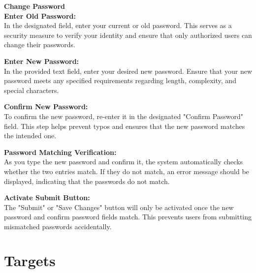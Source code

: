 \documentclass{article}
\begin{document}
\textbf{Change Password}\\
\textbf{Enter Old Password:}\\
In the designated field, enter your current or old password. This serves as a security measure to verify your identity and ensure that only authorized users can change their passwords.

\textbf{Enter New Password:}\\
In the provided text field, enter your desired new password. Ensure that your new password meets any specified requirements regarding length, complexity, and special characters.

\textbf{Confirm New Password:}\\
To confirm the new password, re-enter it in the designated "Confirm Password" field. This step helps prevent typos and ensures that the new password matches the intended one.

\textbf{Password Matching Verification:}\\
As you type the new password and confirm it, the system automatically checks whether the two entries match. If they do not match, an error message should be displayed, indicating that the passwords do not match.

\textbf{Activate Submit Button:}\\
The "Submit" or "Save Changes" button will only be activated once the new password and confirm password fields match. This prevents users from submitting mismatched passwords accidentally.




\section{Targets}
\end{document}

